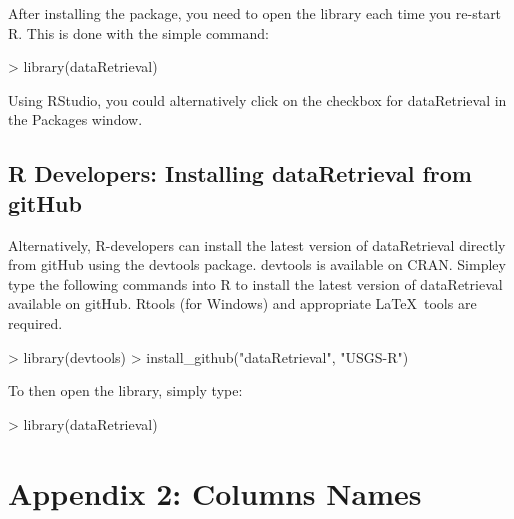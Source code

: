\documentclass[a4paper,11pt]{article}
\begin{document}
After installing the package, you need to open the library each time you re-start R.  This is done with the simple command:
\begin{Schunk}
\begin{Sinput}
> library(dataRetrieval)
\end{Sinput}
\end{Schunk}
Using RStudio, you could alternatively click on the checkbox for dataRetrieval in the Packages window.

\subsection{R Developers: Installing dataRetrieval from gitHub}
Alternatively, R-developers can install the latest version of dataRetrieval directly from gitHub using the devtools package.  devtools is available on CRAN.  Simpley type the following commands into R to install the latest version of dataRetrieval available on gitHub.  Rtools (for Windows) and appropriate \LaTeX\ tools are required.

\begin{Schunk}
\begin{Sinput}
> library(devtools)
> install_github("dataRetrieval", "USGS-R")
\end{Sinput}
\end{Schunk}
To then open the library, simply type:

\begin{Schunk}
\begin{Sinput}
> library(dataRetrieval)
\end{Sinput}
\end{Schunk}


\section{Appendix 2: Columns Names}
\label{sec:appendix2}
\end{document}
